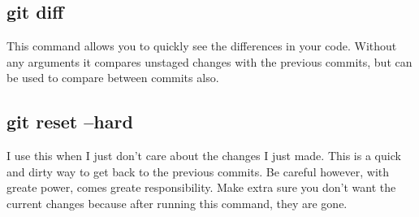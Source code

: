 \documentclass{article}
\begin{document}
\subsection{git diff}
This command allows you to quickly see the differences in your code. Without any arguments it compares unstaged changes
with the previous commits, but can be used to compare between commits also.
\subsection{git reset --hard}
I use this when I just don't care about the changes I just made. This is a quick and dirty way to
get back to the previous commits. Be careful however, with greate power, comes greate responsibility.
Make extra sure you don't want the current changes because after running this command, they are gone.
\end{document}
